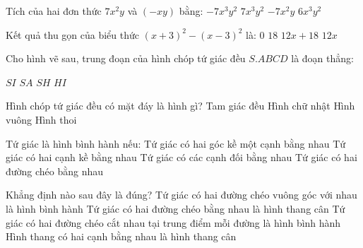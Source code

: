 \documentclass[12pt,a4paper]{article}
\begin{document}
\begin{ex}
Tích của hai đơn thức $7x^2y$ và $(-xy)$ bằng:
\choice
{\True $-7x^3y^2$}
{$7x^3y^2$}
{$-7x^2y$}
{$6x^3y^2$}
\end{ex}

\begin{ex}
Kết quả thu gọn của biểu thức $(x + 3)^2 - (x - 3)^2$ là:
\choice
{$0$}
{$18$}
{$12x + 18$}
{\True $12x$}
\end{ex}

\begin{ex}
Cho hình vẽ sau, trung đoạn của hình chóp tứ giác đều $S.ABCD$ là đoạn thẳng:
\begin{center}
\end{center}
\choice
{\True $SI$}
{$SA$}
{$SH$}
{$HI$}
\end{ex}

\begin{ex}
Hình chóp tứ giác đều có mặt đáy là hình gì?
\choice
{Tam giác đều}
{Hình chữ nhật}
{\True Hình vuông}
{Hình thoi}
\end{ex}

\begin{ex}
Tứ giác là hình bình hành nếu:
\choice
{Tứ giác có hai góc kề một cạnh bằng nhau}
{Tứ giác có hai cạnh kề bằng nhau}
{\True Tứ giác có các cạnh đối bằng nhau}
{Tứ giác có hai đường chéo bằng nhau}
\end{ex}

\begin{ex}
Khẳng định nào sau đây là đúng?
\choice
{Tứ giác có hai đường chéo vuông góc với nhau là hình bình hành}
{Tứ giác có hai đường chéo bằng nhau là hình thang cân}
{\True Tứ giác có hai đường chéo cắt nhau tại trung điểm mỗi đường là hình bình hành}
{Hình thang có hai cạnh bằng nhau là hình thang cân}
\end{ex}
\end{document}

